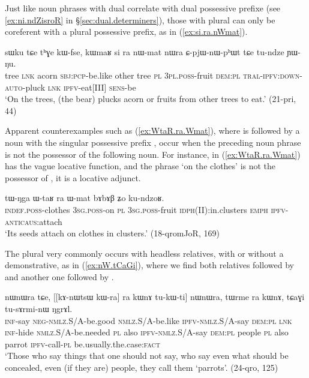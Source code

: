 Just like noun phrases with dual  correlate with dual possessive prefixe (see \ref{ex:ni.ndZisroR} in §\ref{sec:dual.determiners}), those with plural  can only be coreferent with a plural possessive prefix, as  in (\ref{ex:si.ra.nWmat}).

\begin{exe}
\ex \label{ex:si.ra.nWmat}
 \gll  sɯku tɕe tʰɣe kɯ-fse, kɯmaʁ si ra nɯ-mat nɯra ɕ-pjɯ-nɯ-pʰɯt tɕe tu-ndze ɲɯ-ŋu.\\
tree \textsc{lnk} acorn \textsc{sbj}:\textsc{pcp}-be.like other tree \textsc{pl} \textsc{3pl}.\textsc{poss}-fruit \textsc{dem}:\textsc{pl} \textsc{tral}-\textsc{ipfv}:\textsc{down}-\textsc{auto}-pluck \textsc{lnk} \textsc{ipfv}-eat[III] \textsc{sens}-be \\
\glt `On the trees, (the bear) plucks acorn or fruits from other trees to eat.' (21-pri, 44)
\end{exe}

Apparent counterexamples such as (\ref{ex:WtaR.ra.Wmat}), where  is followed by a noun with the singular possessive prefix , occur when the preceding noun phrase is not the possessor of the following noun. For instance, in (\ref{ex:WtaR.ra.Wmat})  has the vague locative function, and the phrase  `on the clothes' is not the possessor of , it is a locative adjunct.

\begin{exe}
\ex \label{ex:WtaR.ra.Wmat}
 \gll tɯ-ŋga ɯ-taʁ ra ɯ-mat bɤbɤβ ʑo ku-ndzoʁ. \\
 \textsc{indef}.\textsc{poss}-clothes \textsc{3sg}.\textsc{poss}-on \textsc{pl} \textsc{3sg}.\textsc{poss}-fruit \textsc{idph}(II):in.clusters \textsc{emph} \textsc{ipfv}-\textsc{anticaus}:attach \\
\glt `Its seeds attach on clothes in clusters.' (18-qromJoR, 169)
\end{exe}

The plural  very commonly occurs with headless relatives, with or without a demonstrative, as in (\ref{ex:nW.tCaGi}), where we find both relatives followed by  and another one followed by .

\begin{exe}
\ex \label{ex:nW.tCaGi}
\gll [kɤ-ti mɤ-kɯ-pe kɯ-fse tu-kɯ-ti] nɯnɯra tɕe, [[kɤ-nɯtsɯ kɯ-ra] ra kɯnɤ tu-kɯ-ti] nɯnɯra, 
tɯrme ra kɯnɤ, tɕaɣi tu-sɤrmi-nɯ ŋgrɤl.  \\
\textsc{inf}-say \textsc{neg}-\textsc{nmlz}.S/A-be.good \textsc{nmlz}.S/A-be.like \textsc{ipfv}-\textsc{nmlz}.S/A-say \textsc{dem}:\textsc{pl} \textsc{lnk} \textsc{inf}-hide \textsc{nmlz}.S/A-be.needed \textsc{pl} also \textsc{ipfv}-\textsc{nmlz}.S/A-say \textsc{dem}:\textsc{pl} people \textsc{pl} also  parrot \textsc{ipfv}-call-\textsc{pl} be.usually.the.case:\textsc{fact} \\
\glt `Those who say things that one should not say, who say even what should be concealed, even (if they are) people, they call them `parrots'. (24-qro, 125)
\end{exe} 

